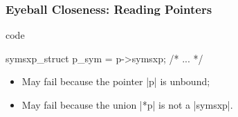 \documentclass{beamer}
\begin{document}
\begin{frame}[fragile]
    \label{frame:reading:pointers}
    \frametitle{Eyeball Closeness: Reading Pointers}

    \begin{changemargin}{-5mm}{-5mm}

\begin{minipage}{.6\textwidth}
    {\Cn{} code}
\begin{ccode}
symsxp_struct p_sym = p->symsxp;
/* ... */
\end{ccode}
\end{minipage}
    \begin{minipage}{.45\textwidth}
    \begin{itemize}
        \item May fail because the pointer \cinline|p| is unbound;
        \item May fail because the union \cinline|*p| is not a \cinline|symsxp|.
    \end{itemize}
    \end{minipage}

\vfill


\end{changemargin}
\end{frame}
\end{document}
